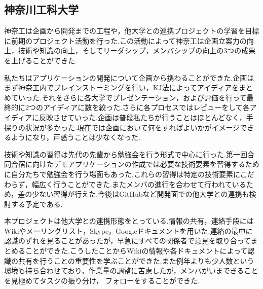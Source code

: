 \subsection{神奈川工科大学}
\par 神奈工は企画から開発までの工程や，他大学との連携プロジェクトの学習を目標に前期のプロジェクト活動を行った.この活動によって神奈工は企画立案力の向上，技術や知識の向上，そしてリーダシップ，メンバシップの向上の3つの成果を上げることができた.
\par 私たちはアプリケーションの開発について企画から携わることができた.企画はまず神奈工内でブレインストーミングを行い，KJ法によってアイディアをまとめていった.それをさらに各大学でプレゼンテーション，および評価を行って最終的に2つのアイディアに数を絞った.さらに各プロセスではレビューをして各アイディアに反映させていった.企画は普段私たちが行うことはほとんどなく，手探りの状況が多かった.現在では企画において何をすればよいかがイメージできるようになり，戸惑うことは少なくなった.
\par 技術や知識の習得は先代の先輩から勉強会を行う形式で中心に行った.第一回合同合宿に向けたデモアプリケーションの作成では必要な技術要素を習得するために自分たちで勉強会を行う場面もあった.これらの習得は特定の技術要素にこだわらず，幅広く行うことができた.またメンバの進行を合わせて行われているため，差の少ない習得が行えた.今後はGitHubなど開発面での他大学との連携も検討する予定である.
\par 本プロジェクトは他大学との連携形態をとっている.情報の共有，連絡手段にはWikiやメーリングリスト，Skype，Googleドキュメントを用いた.連絡の最中に認識のずれを見ることがあったが，早急にすべての関係者で意見を取り合ってまとめることができた.こうしたことからWikiの情報や各ドキュメントによって認識の共有を行うことの重要性を学ぶことができた.また例年よりも少人数という環境も持ち合わせており，作業量の調整に苦慮したが，メンバがいまできることを見極めてタスクの振り分け， フォローをすることができた.
